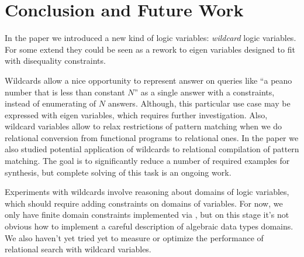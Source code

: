 
\section{Conclusion and Future Work}

In  the paper we introduced a new kind of logic variables: \emph{wildcard} logic variables.
For some extend they could be seen as a rework to eigen variables designed to fit with disequality constraints. 

Wildcards allow a nice opportunity to represent answer on queries like ``a peano number that is less than constant $N$'' as a single answer with a constraints, instead of enumerating of $N$ answers. Although, this particular use case may be expressed with eigen variables, which requires further investigation. Also, wildcard variables allow to relax restrictions of pattern matching when we do relational conversion from functional programs to relational ones. 
In the paper we also studied potential application of wildcards to relational compilation of pattern matching. The goal is to significantly reduce a number of required examples for synthesis, but complete solving of this task is an ongoing work. 

Experiments with wildcards involve reasoning about domains of logic variables, which should require adding constraints on  domains of variables. For now, we only have finite domain constraints implemented via \Zthree{}, but on this stage it's not obvious how to implement a  careful description of algebraic data types domains. We also haven't yet tried yet to measure or optimize the performance of relational search with wildcard variables.